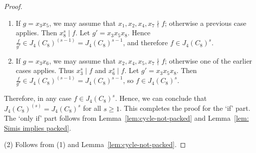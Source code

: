 \documentclass[10pt,a4paper]{amsart}
\begin{document}
\begin{proof}
\begin{enumerate}
\item If $g = x_3x_5$, we may assume that
$x_1,x_2,x_4,x_7 \nmid f$; otherwise a previous case applies.
Then $x_8^s \mid f$.
Let $g' = x_3x_5x_8$. Hence
$\frac{f}{g'} \in J_4(C_8)^{(s-1)} = J_4(C_8)^{s-1}$,
and therefore $f \in J_4(C_8)^s$.

\item If $g = x_3x_6$, we may assume that
$x_2,x_4,x_5,x_7 \nmid f$; otherwise one of the earlier cases applies.
Thus $x_3^s \mid f$ and $x_6^s \mid f$.
Let $g' = x_3x_5x_8$. Then
$\frac{f}{g'} \in J_4(C_8)^{(s-1)} = J_4(C_8)^{s-1}$,
so $f \in J_4(C_8)^s$.

\end{enumerate}
Therefore, in any case $f\in J_4(C_8)^s$. Hence, we can conclude that $J_4(C_8)^{(s)} = J_4(C_8)^s$ for all $s \ge 1$. This completes the proof for the `if' part. The `only if' part follows from Lemma~\ref{lem:cycle-not-packed}
and Lemma~\ref{lem: Simis implies packed}.

\medskip 
\noindent
(2) Follows from (1) and Lemma~\ref{lem:cycle-not-packed}.
\end{proof}
\end{document}
